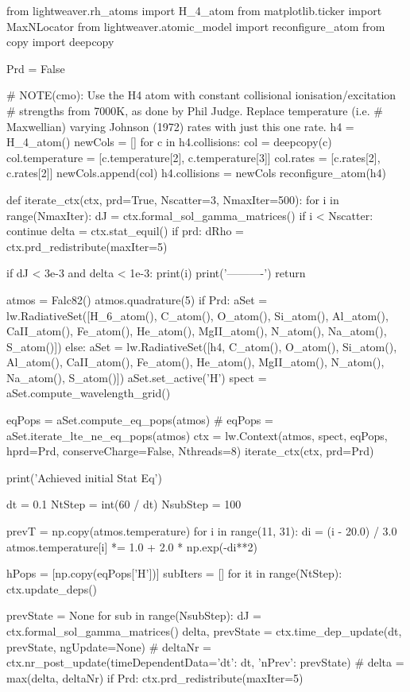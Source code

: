 \begin{pycode}[Lw]
from lightweaver.rh_atoms import H_4_atom
from matplotlib.ticker import MaxNLocator
from lightweaver.atomic_model import reconfigure_atom
from copy import deepcopy

Prd = False

# NOTE(cmo): Use the H4 atom with constant collisional ionisation/excitation
# strengths from 7000K, as done by Phil Judge. Replace temperature (i.e.
# Maxwellian) varying Johnson (1972) rates with just this one rate.
h4 = H_4_atom()
newCols = []
for c in h4.collisions:
    col = deepcopy(c)
    col.temperature = [c.temperature[2], c.temperature[3]]
    col.rates = [c.rates[2], c.rates[2]]
    newCols.append(col)
h4.collisions = newCols
reconfigure_atom(h4)

def iterate_ctx(ctx, prd=True, Nscatter=3, NmaxIter=500):
    for i in range(NmaxIter):
        dJ = ctx.formal_sol_gamma_matrices()
        if i < Nscatter:
            continue
        delta = ctx.stat_equil()
        if prd:
            dRho = ctx.prd_redistribute(maxIter=5)

        if dJ < 3e-3 and delta < 1e-3:
            print(i)
            print('----------')
            return

atmos = Falc82()
atmos.quadrature(5)
if Prd:
    aSet = lw.RadiativeSet([H_6_atom(), C_atom(), O_atom(), Si_atom(), Al_atom(), CaII_atom(), Fe_atom(), He_atom(), MgII_atom(), N_atom(), Na_atom(), S_atom()])
else:
    aSet = lw.RadiativeSet([h4, C_atom(), O_atom(), Si_atom(), Al_atom(), CaII_atom(), Fe_atom(), He_atom(), MgII_atom(), N_atom(), Na_atom(), S_atom()])
aSet.set_active('H')
spect = aSet.compute_wavelength_grid()

eqPops = aSet.compute_eq_pops(atmos)
# eqPops = aSet.iterate_lte_ne_eq_pops(atmos)
ctx = lw.Context(atmos, spect, eqPops,
                 hprd=Prd, conserveCharge=False, Nthreads=8)
iterate_ctx(ctx, prd=Prd)

print('Achieved initial Stat Eq')

dt = 0.1
NtStep = int(60 / dt)
NsubStep = 100

prevT = np.copy(atmos.temperature)
for i in range(11, 31):
    di = (i - 20.0) / 3.0
    atmos.temperature[i] *= 1.0 + 2.0 * np.exp(-di**2)

hPops = [np.copy(eqPops['H'])]
subIters = []
for it in range(NtStep):
    ctx.update_deps()

    prevState = None
    for sub in range(NsubStep):
        dJ = ctx.formal_sol_gamma_matrices()
        delta, prevState = ctx.time_dep_update(dt, prevState, ngUpdate=None)
        # deltaNr = ctx.nr_post_update(timeDependentData={'dt': dt, 'nPrev': prevState})
        # delta = max(delta, deltaNr)
        if Prd:
            ctx.prd_redistribute(maxIter=5)


\end{pycode}
